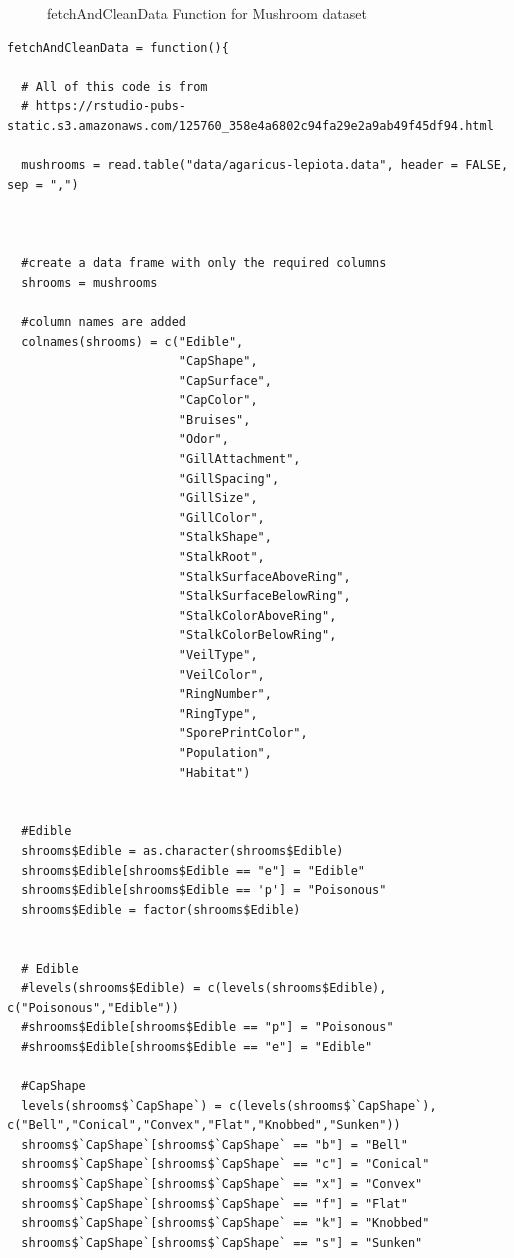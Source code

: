 \documentclass[10pt  ,usenames, dvipsnames]{article}\usepackage[]{graphicx}\usepackage[]{color}
\begin{document}
\label{figHelper}
\begin{figure}[H]
\caption {fetchAndCleanData Function for Mushroom dataset}
\end {figure}
    \begin{lstlisting}
fetchAndCleanData = function(){
  
  # All of this code is from
  # https://rstudio-pubs-static.s3.amazonaws.com/125760_358e4a6802c94fa29e2a9ab49f45df94.html
  
  mushrooms = read.table("data/agaricus-lepiota.data", header = FALSE, sep = ",")
  
  
  
  #create a data frame with only the required columns
  shrooms = mushrooms
  
  #column names are added
  colnames(shrooms) = c("Edible",
                        "CapShape",
                        "CapSurface",
                        "CapColor",
                        "Bruises",                        
                        "Odor",
                        "GillAttachment",
                        "GillSpacing",
                        "GillSize",
                        "GillColor",
                        "StalkShape",
                        "StalkRoot",
                        "StalkSurfaceAboveRing",
                        "StalkSurfaceBelowRing",
                        "StalkColorAboveRing",
                        "StalkColorBelowRing",
                        "VeilType",
                        "VeilColor",
                        "RingNumber",
                        "RingType",
                        "SporePrintColor",
                        "Population",
                        "Habitat")
  
  
  #Edible
  shrooms$Edible = as.character(shrooms$Edible)
  shrooms$Edible[shrooms$Edible == "e"] = "Edible"
  shrooms$Edible[shrooms$Edible == 'p'] = "Poisonous"
  shrooms$Edible = factor(shrooms$Edible)
  
  
  # Edible
  #levels(shrooms$Edible) = c(levels(shrooms$Edible), c("Poisonous","Edible"))
  #shrooms$Edible[shrooms$Edible == "p"] = "Poisonous"
  #shrooms$Edible[shrooms$Edible == "e"] = "Edible"
  
  #CapShape
  levels(shrooms$`CapShape`) = c(levels(shrooms$`CapShape`), c("Bell","Conical","Convex","Flat","Knobbed","Sunken"))
  shrooms$`CapShape`[shrooms$`CapShape` == "b"] = "Bell"
  shrooms$`CapShape`[shrooms$`CapShape` == "c"] = "Conical"
  shrooms$`CapShape`[shrooms$`CapShape` == "x"] = "Convex"
  shrooms$`CapShape`[shrooms$`CapShape` == "f"] = "Flat"
  shrooms$`CapShape`[shrooms$`CapShape` == "k"] = "Knobbed"
  shrooms$`CapShape`[shrooms$`CapShape` == "s"] = "Sunken"
  

\end{lstlisting}
\end{document}
